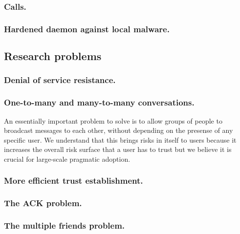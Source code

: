 \subsubsection{Calls.}

\subsubsection{Hardened daemon against local malware.}

\subsection{Research problems}

\subsubsection{Denial of service resistance.}

\subsubsection{One-to-many and many-to-many conversations.} An essentially important problem to solve is to allow groups of people to broadcast messages to each other, without depending on the presense of any specific user. We understand that this brings risks in itself to users because it increases the overall risk surface that a user has to trust but we believe it is crucial for large-scale pragmatic adoption.

\subsubsection{More efficient trust establishment.}

\subsubsection{The ACK problem.}

\subsubsection{The multiple friends problem.}
